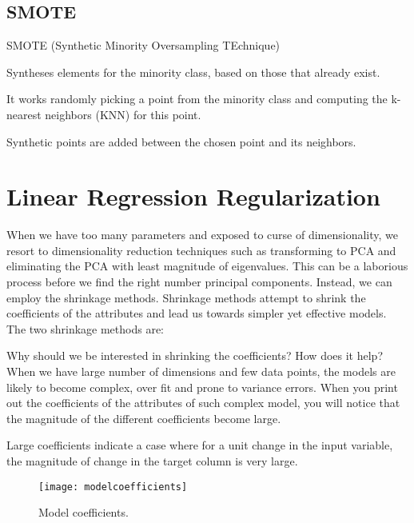 	\subsection{SMOTE}
SMOTE (Synthetic Minority Oversampling TEchnique)
	\begin{bulletedlist}
		\item Syntheses elements for the minority class, based on those that already exist.
		\item It works randomly picking a point from the minority class and computing the k-nearest neighbors (KNN) for this point.
		\item Synthetic points are added between the chosen point and its neighbors.
	\end{bulletedlist}


	\section{Linear Regression Regularization}

When we have too many parameters and exposed to curse of dimensionality, we resort to dimensionality reduction techniques such as transforming to PCA and eliminating the PCA with least magnitude of eigenvalues. This can be a laborious process before we find the right number principal components. Instead, we can employ the shrinkage methods.  Shrinkage methods attempt to shrink the coefficients of the attributes and lead us towards simpler yet effective models. The two shrinkage methods are:

Why should we be interested in shrinking the coefficients? How does it help?  When we have large number of dimensions and few data points, the models are likely to become complex, over fit and prone to variance errors. When you print out the coefficients of the attributes of such complex model, you will notice that the magnitude of the different coefficients become large.

Large coefficients indicate a case where for a unit change in the input variable, the magnitude of change in the target column is very large.

	\begin{figure}[tbh]
		\centering
		\texttt{[image: modelcoefficients]}
		\caption{Model coefficients.}
		\label{fig:modelcoefficients}
	\end{figure}

